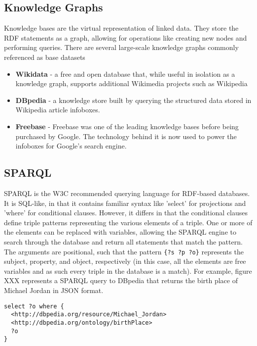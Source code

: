 \documentclass[sigplan,screen]{acmart}
\begin{document}
\subsection{Knowledge Graphs}

Knowledge bases are the virtual representation of linked data. They store the RDF statements as a graph, allowing for operations like creating new nodes and performing queries. There are several large-scale knowledge graphs commonly referenced as base datasets

\begin{itemize}
    \item \textbf{Wikidata} - a free and open database that, while useful in isolation as a knowledge graph, supports additional Wikimedia projects such as Wikipedia
    \item \textbf{DBpedia} - a knowledge store built by querying the structured data stored in Wikipedia article infoboxes.
    \item \textbf{Freebase} - Freebase was one of the leading knowledge bases before being purchased by Google. The technology behind it is now used to power the infoboxes for Google's search engine.
\end{itemize}

\subsection{SPARQL}

SPARQL is the W3C recommended querying language for RDF-based databases. It is SQL-like, in that it contains familiar syntax like 'select' for projections and 'where' for conditional clauses. However, it differs in that the conditional clauses define triple patterns representing the various elements of a triple. One or more of the elements can be replaced with variables, allowing the SPARQL engine to search through the database and return all statements that match the pattern. The arguments are positional, such that the pattern \texttt{\{?s ?p ?o\}} represents the subject, property, and object, respectively (in this case, all the elements are free variables and as such every triple in the database is a match). For example, figure XXX represents a SPARQL query to DBpedia that returns the birth place of Michael Jordan in JSON format.

\begin{lstlisting}[language=SPARQL,frame=single,breaklines=true]
select ?o where {
  <http://dbpedia.org/resource/Michael_Jordan>
  <http://dbpedia.org/ontology/birthPlace>
  ?o
}
\end{lstlisting}
\end{document}
